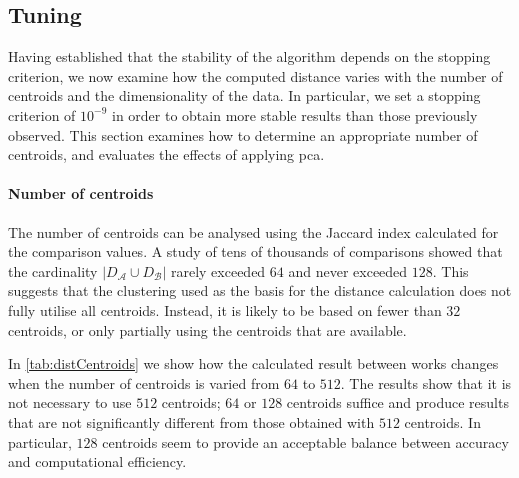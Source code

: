 \begin{toReview}
	\subsection{Tuning} Having established that the stability of the algorithm depends on the stopping criterion, we now examine how the computed distance varies with the number of centroids and the dimensionality of the data. In particular, we set a stopping criterion of $10^{-9}$ in order to obtain more stable results than those previously observed. This section examines how to determine an appropriate number of centroids, and evaluates the effects of applying \gls{pca}.

	\paragraph{Number of centroids} The number of centroids can be analysed using the Jaccard index calculated for the comparison values. A study of tens of thousands of comparisons showed that the cardinality $\left|D_\mathcal{A}\cup D_\mathcal{B}\right|$ rarely exceeded $64$ and never exceeded $128$. This suggests that the clustering used as the basis for the distance calculation does not fully utilise all centroids. Instead, it is likely to be based on fewer than $32$ centroids, or only partially using the centroids that are available.

	\noindent In \cref{tab:distCentroids} we show how the calculated result between works changes when the number of centroids is varied from $64$ to $512$. The results show that it is not necessary to use $512$ centroids; $64$ or $128$ centroids suffice and produce results that are not significantly different from those obtained with $512$ centroids. In particular, $128$ centroids seem to provide an acceptable balance between accuracy and computational efficiency.


\end{toReview}
